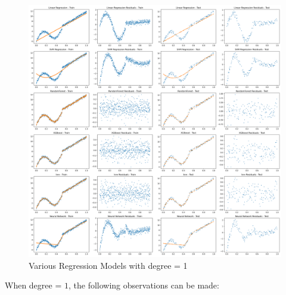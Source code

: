 \begin{figure}[H]
	\centering
	\includegraphics[width=\linewidth]{./Images/E3-MLR3-1.png}
	\caption{Various Regression Models with degree = 1}
\end{figure}

When degree = $1$, the following observations can be made:

